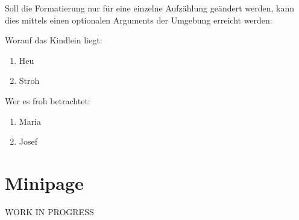 Soll die Formatierung nur für eine einzelne Aufzählung geändert werden, kann dies mittels einen optionalen Arguments der Umgebung erreicht werden:
\begin{latexlisting}
	Worauf das Kindlein liegt:
	\begin{enumerate}[label=|\Alph*|]
		\item Heu
		\item Stroh
	\end{enumerate}
	Wer es froh betrachtet:
	\begin{enumerate}[label=\textbf{\Roman*}]
		\item Maria
		\item Josef
	\end{enumerate}
\end{latexlisting}

\section{Minipage}
WORK IN PROGRESS
